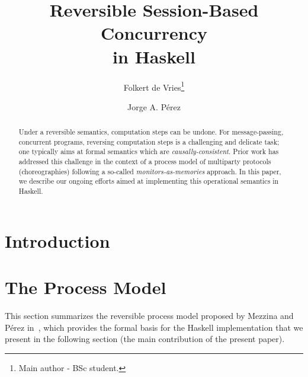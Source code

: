 \documentclass[runningheads]{llncs}
\begin{document}
%
\title{Reversible Session-Based Concurrency \\ in Haskell}
%
%
\author{Folkert de Vries\thanks{Main author - BSc student.} \and
Jorge A. P\'{e}rez}
%
%
%
\maketitle              %
%
\begin{abstract}
Under a reversible semantics, computation steps can be undone. 
For message-passing, concurrent programs, reversing computation steps is a challenging and delicate task; one typically aims at formal semantics which are \emph{causally-consistent}. 
Prior work has addressed this challenge in the context of a process model of multiparty protocols (choreographies) following a so-called \emph{monitors-as-memories} approach.
In this paper, we describe our ongoing efforts aimed at implementing this operational semantics in Haskell. 
\end{abstract}
%
%
%
\section{Introduction}


\section{The Process Model}

This section summarizes the reversible process model proposed by Mezzina and P\'{e}rez in~\cite{DBLP:conf/ppdp/MezzinaP17}, which provides the formal basis for the Haskell implementation that we present in the following section (the main contribution of the present paper).
\end{document}
